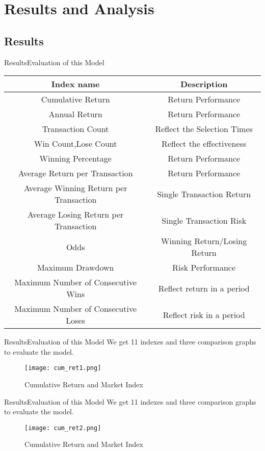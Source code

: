 \documentclass{beamer}
\begin{document}
\section{Results and Analysis}

\subsection{Results}
\begin{frame}{Results}{Evaluation of this Model}
\small
  \begin{tabular}{*{2}{c}}
  \toprule
  Index name & Description\\
  \midrule
  Cumulative Return & Return Performance\\
  Annual Return & Return Performance\\
  Transaction Count & Reflect the Selection Times\\
  Win Count,Lose Count & Reflect the effectiveness\\
  Winning Percentage & Return Performance\\
  Average Return per Transaction & Return Performance\\
  Average Winning Return per Transaction & Single Transaction Return\\
  Average Losing Return per Transaction & Single Transaction Risk \\
  Odds & Winning Return/Losing Return\\
  Maximum Drawdown & Risk Performance\\
  Maximum Number of Consecutive Wins & Reflect return in a period\\
  Maximum Number of Consecutive Loses & Reflect risk in a period\\
  \bottomrule
  \end{tabular}
\end{frame}

\begin{frame}{Results}{Evaluation of this Model}
We get 11 indexes and three comparison graphs to evaluate the model.
\begin{figure}
\centering
\texttt{[image: cum\_ret1.png]}
\caption{Cumulative Return and Market Index}
\label{fig:graph}
\end{figure}
\end{frame}

\begin{frame}{Results}{Evaluation of this Model}
We get 11 indexes and three comparison graphs to evaluate the model.
\begin{figure}
\centering
\texttt{[image: cum\_ret2.png]}
\caption{Cumulative Return and Market Index}
\label{fig:graph}
\end{figure}
\end{frame}
\end{document}
